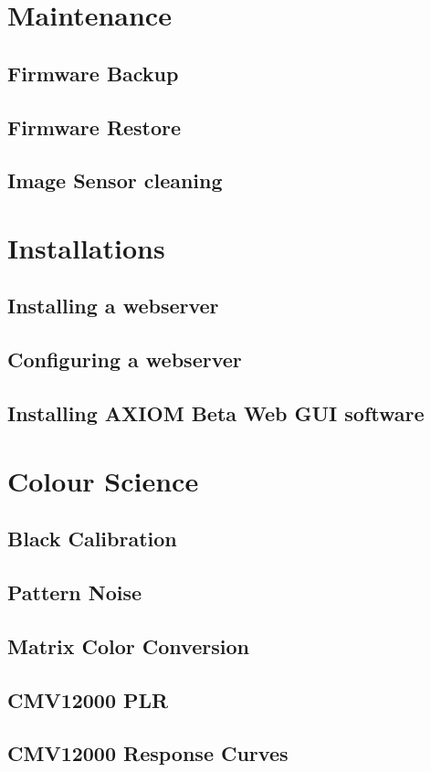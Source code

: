 \documentclass{article}
\begin{document}
\section{Maintenance}
\subsection{Firmware Backup}
\subsection{Firmware Restore}
\subsection{Image Sensor cleaning}

\section{Installations}
\subsection{Installing a webserver}
\subsection{Configuring a webserver}
\subsection{Installing AXIOM Beta Web GUI software}

\section{Colour Science}
\subsection{Black Calibration}
\subsection{Pattern Noise}
\subsection{Matrix Color Conversion} %
\subsection{CMV12000 PLR}
\subsection{CMV12000 Response Curves}
\end{document}
